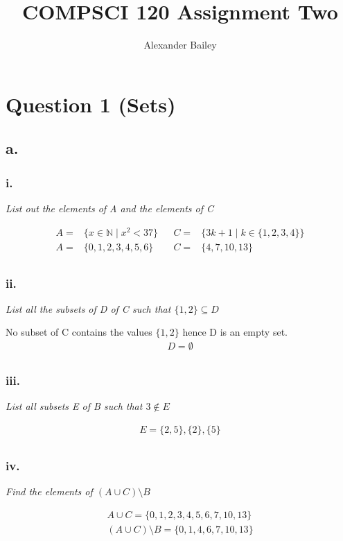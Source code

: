\documentclass[a4paper, 12pt]{article}
\title{COMPSCI 120 Assignment Two}
\author{Alexander Bailey}
\begin{document}
\maketitle

\section*{Question 1 (Sets)}
\subsection*{a.}
\subsubsection*{i.}
\begin{center} \textit{List out the elements of A and the elements of C} \end{center}
\begin{align*}
    A = &\{ x \in \mathbb{N} \mid x^2 < 37 \} && C = &\{3k+1 \mid k \in \{1, 2, 3, 4\}\} \\
    A = &\{0, 1, 2, 3, 4, 5, 6 \} && C = &\{ 4, 7, 10, 13 \} \\
\end{align*}

\subsubsection*{ii.}
\begin{center} \textit{List all the subsets of D of C such that $\{1,2\} \subseteq D$} \end{center}
No subset of C contains the values $\{1,2\}$ hence D is an empty set. 
\begin{align*}
    D = \emptyset \\
\end{align*}

\subsubsection*{iii.}
\begin{center} \textit{List all subsets E of B such that $3 \notin E$} \end{center}
\begin{align*}
    E = \{ 2,5 \}, \{2\}, \{5\} \\ 
\end{align*}
\subsubsection*{iv.}
\begin{center} \textit{Find the elements of $(A \cup C) \setminus B$ } \end{center}
\begin{align*}
    A \cup C = \{ 0, 1, 2, 3, 4, 5, 6, 7, 10, 13 \} \\
    (A \cup C) \setminus B = \{0, 1, 4, 6, 7, 10, 13 \} \\
\end{align*}
\end{document}
